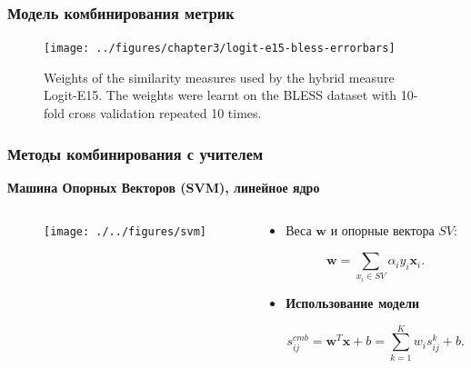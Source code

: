 \begin{frame}
\frametitle{Модель комбинирования метрик}

\begin{figure}
\centering
\texttt{[image: ../figures/chapter3/logit-e15-bless-errorbars]}
\caption{ Weights of the similarity measures used by the hybrid measure Logit-E15. The weights were learnt on the BLESS dataset with 10-fold cross validation repeated 10 times. }
\end{figure}

\end{frame}





\begin{frame}
\frametitle{Методы комбинирования с учителем}

\textbf{Машина Опорных Векторов (SVM), линейное ядро} 


\begin{columns}
  \begin{column}{0.5\textwidth}
\begin{figure}
\centering
\texttt{[image: ./../figures/svm]}
\end{figure}
    
  \end{column}

  \begin{column}{0.5\textwidth}
\begin{itemize}
\item Веса $\mathbf{w}$ и опорные вектора $SV$: 

$$
\mathbf{w} = \sum_{x_i \in SV} \alpha_i y_i \mathbf{x}_i.  
$$

\item \textbf{Использование модели} 

$$
s_{ij}^{cmb} = \mathbf{w}^T\mathbf{x} + b = \sum_{k=1}^K w_i s_{ij}^k + b.
$$

\end{itemize}    
  \end{column}
\end{columns}


\end{frame}





